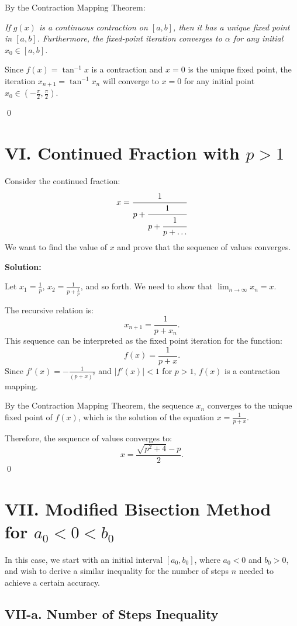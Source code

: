 \documentclass[a4paper]{article}
\begin{document}
By the Contraction Mapping Theorem:

\textit{If $g(x)$ is a continuous contraction on $[a,b]$, then it has a unique fixed point in $[a,b]$. Furthermore, the fixed-point iteration converges to $\alpha$ for any initial $x_0 \in [a,b]$.}

Since $f(x) = \tan^{-1} x$ is a contraction and $x = 0$ is the unique fixed point, the iteration $x_{n+1} = \tan^{-1} x_n$ will converge to $x = 0$ for any initial point $x_0 \in \left(-\frac{\pi}{2}, \frac{\pi}{2}\right)$.

\qed


\section*{VI. Continued Fraction with $p > 1$}

Consider the continued fraction:
\[
x = \cfrac{1}{p + \cfrac{1}{p + \cfrac{1}{p + \dots}}}
\]
We want to find the value of $x$ and prove that the sequence of values converges.

\textbf{Solution:}

 Let $x_1 = \frac{1}{p}$, $x_2 = \frac{1}{p + \frac{1}{p}}$, and so forth. We need to show that $\lim_{n \to \infty} x_n = x$.

The recursive relation is:
\[
x_{n+1} = \frac{1}{p + x_n}.
\]
This sequence can be interpreted as the fixed point iteration for the function:
\[
f(x) = \frac{1}{p + x}.
\]
Since $f'(x) = -\frac{1}{(p+x)^2}$ and $|f'(x)| < 1$ for $p > 1$, $f(x)$ is a contraction mapping. 

By the Contraction Mapping Theorem, the sequence $x_n$ converges to the unique fixed point of $f(x)$, which is the solution of the equation $x = \frac{1}{p + x}$.

Therefore, the sequence of values converges to:
\[
x = \frac{\sqrt{p^2 + 4} - p}{2}.
\]
\qed

\section*{VII. Modified Bisection Method for \( a_0 < 0 < b_0 \)}

In this case, we start with an initial interval \( [a_0, b_0] \), where \( a_0 < 0 \) and \( b_0 > 0 \), and wish to derive a similar inequality for the number of steps \( n \) needed to achieve a certain accuracy.

\subsection*{VII-a. Number of Steps Inequality}
\end{document}
